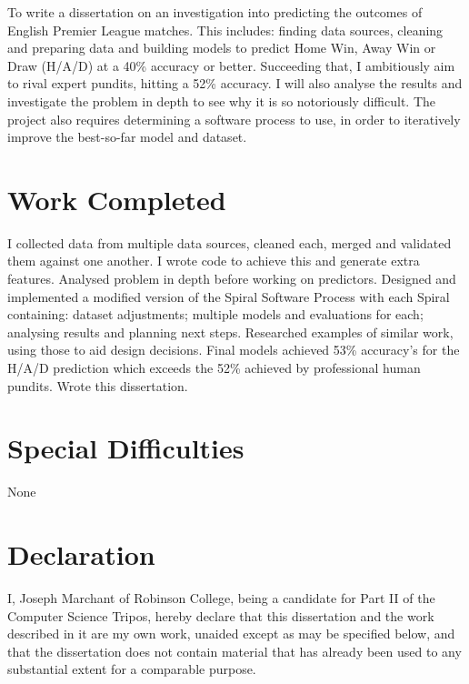\documentclass[12pt,a4paper,twoside,openright]{report}
\begin{document}
To write a dissertation on an investigation into predicting the outcomes of English Premier League matches. This includes: finding data sources, cleaning and preparing data and building models to predict Home Win, Away Win or Draw (H/A/D) at a 40\% accuracy or better. Succeeding that, I ambitiously aim to rival expert pundits, hitting a 52\% accuracy. I will also analyse the results and investigate the problem in depth to see why it is so notoriously difficult. The project also requires determining a software process to use, in order to iteratively improve the best-so-far model and dataset.

\vspace{-0.5cm}

\section*{Work Completed}

I collected data from multiple data sources, cleaned each, merged and validated them against one another. I wrote code to achieve this and generate extra features. Analysed problem in depth before working on predictors. Designed and implemented a modified version of the Spiral Software Process with each Spiral containing: dataset adjustments; multiple models and evaluations for each; analysing results and planning next steps. Researched examples of similar work, using those to aid design decisions. Final models achieved 53\% accuracy's for the H/A/D prediction which exceeds the 52\% achieved by professional human pundits. Wrote this dissertation.

\vspace{-0.5cm}

\section*{Special Difficulties}

None
 
\newpage
\section*{Declaration}

I, Joseph Marchant of Robinson College, being a candidate for Part II of the Computer Science Tripos, hereby declare that this dissertation and the work described in it are my own work, unaided except as may be specified below, and that the dissertation does not contain material that has already been used to any substantial extent for a comparable purpose.
\end{document}
